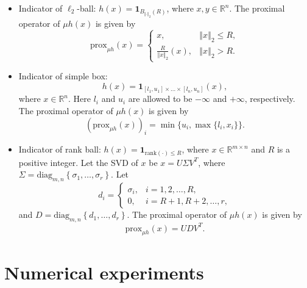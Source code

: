 \documentclass[a4paper]{article}
\newcommand{\norm}[1]{\left\Vert#1\right\Vert}
\newcommand{\mr}{\mathbb{R}}
\newcommand{\prox}{\mathrm{prox}}
\newcommand{\mi}{\mathbf{1}}
\newcommand{\diag}{\mathrm{diag}}
\newcommand{\rank}{\mathrm{rank}}
\begin{document}
\begin{itemize}
    \item {Indicator of $\ell_2$-ball:} $h(x) = 
    \mi_{ B_{\norm{\cdot}_2}(R)}$, where $x, y \in \mr^n$.
    The proximal operator of $\mu h(x)$ is given by
    \begin{displaymath}
      \prox_{\mu h}(x) = 
      \begin{cases}
        x, & \norm{x}_2 \le R, \\
        \frac{R}{\norm{x}_2}(x), & \norm{x}_2 > R.
      \end{cases}
    \end{displaymath}
    
    \item {Indicator of simple box:} $$h(x) = \mi_{[l_1,u_1] \times 
      \ldots \times [l_n,u_n]}(x),$$
    where $x \in \mr^n$. Here $l_i$ and $u_i$ are allowed to be 
    $-\infty$ and $+\infty$, respectively. The proximal operator of 
    $\mu h(x)$ is given by
    \begin{displaymath}
      (\prox_{\mu h}(x))_i = \min\{ u_i, \max\{l_i, x_i\} \}.
    \end{displaymath}
    
    \item {Indicator of rank ball:} $h(x) = \mi_{\rank(\cdot) \le 
      R}$, 
    where $x \in \mr^{m \times n}$ and $R$ is a positive integer. Let 
    the SVD of $x$ be $x = U \Sigma V^T$, where $\Sigma = 
    \diag_{m,n}\left\{ \sigma_1, \ldots, \sigma_r \right\}$. Let 
    \begin{displaymath}
      d_i = 
      \begin{cases}
        \sigma_i, & i = 1, 2, \ldots, R, \\
        0, & i = R+1, R+2, \ldots, r,
      \end{cases}
    \end{displaymath}
    and $D = \diag_{m,n}\left\{ d_1, \ldots, d_r \right\}$.
    The proximal operator of $\mu h(x)$ is given by
    \begin{displaymath}
      \prox_{\mu h}(x) = U D V^T.
    \end{displaymath}
    
  \end{itemize}
  
  
  
  
  
  
  \section{Numerical experiments}
  \label{sec:num}
  
\end{document}
